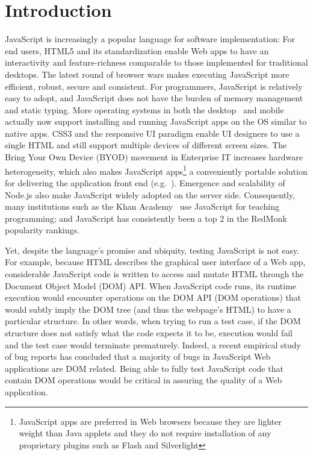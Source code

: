 \section{Introduction}
JavaScript is increasingly a popular language for software implementation: %
For end users, HTML5 and its standardization enable Web apps to have an interactivity and feature-richness comparable to those implemented for traditional desktops.  
The latest round of browser wars makes executing JavaScript more efficient, robust, secure and consistent.  
For programmers, JavaScript is relatively easy to adopt, and JavaScript does not have the burden of memory management and static typing.
More operating systems in both the desktop~\cite{chromeApps, windows8javascript} and mobile~\cite{apacheCordova, iosWebView, blackberryWebWorks, firefoxOS, androidWebView, tizen} actually now support installing and running JavaScript apps on the OS similar to native apps.
CSS3 and the responsive UI paradigm enable UI designers to use a single HTML and still support multiple devices of different screen sizes.  
The Bring Your Own Device (BYOD) movement in Enterprise IT increases hardware heterogeneity, 
which also makes JavaScript apps\footnote{JavaScript apps are preferred in Web browsers because they are lighter weight than Java applets and they do not require installation of any proprietary plugins such as Flash and Silverlight} 
a conveniently portable solution for delivering the application front end (e.g.~\cite{BNSFoffice365}).
Emergence and scalability of Node.js also make JavaScript widely adopted on the server side.  
Consequently, many institutions such as the Khan Academy~\cite{khanAcademy} use JavaScript for teaching programming; and JavaScript has consistently been a top 2 in the RedMonk~\cite{redmonk} popularity rankings.%

Yet, despite the language's promise and ubiquity, testing JavaScript is not easy.  
For example, because HTML describes the graphical user interface of a Web app, considerable JavaScript code is written to access and mutate HTML through the Document Object Model (DOM) API.  
When JavaScript code runs, its runtime execution would encounter operations on the DOM API (DOM operations) that would subtly imply the DOM tree (and thus the webpage's HTML) to have a particular structure.  
In other words, when trying to run a test case, if the DOM structure does not satisfy what the code expects it to be, execution would fail and the test case would terminate prematurely.  
Indeed, a recent empirical study~\cite{frolin2013} of bug reports has concluded that a majority of bugs in JavaScript Web applications are DOM related.  
Being able to fully test JavaScript code that contain DOM operations would be critical in assuring the quality of a Web application.  



